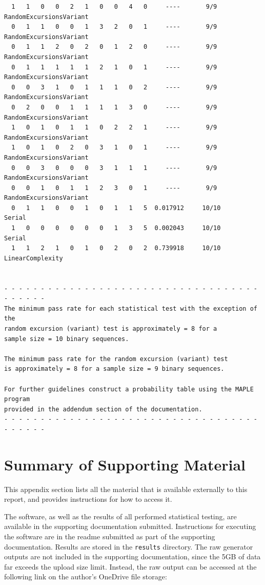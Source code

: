 \documentclass[12pt, titlepage]{report}
\theoremstyle{definition}
\begin{document}
\begin{verbatim}
  1   1   0   0   2   1   0   0   4   0     ----       9/9       RandomExcursionsVariant
  0   1   1   0   0   1   3   2   0   1     ----       9/9       RandomExcursionsVariant
  0   1   1   2   0   2   0   1   2   0     ----       9/9       RandomExcursionsVariant
  0   1   1   1   1   1   2   1   0   1     ----       9/9       RandomExcursionsVariant
  0   0   3   1   0   1   1   1   0   2     ----       9/9       RandomExcursionsVariant
  0   2   0   0   1   1   1   1   3   0     ----       9/9       RandomExcursionsVariant
  1   0   1   0   1   1   0   2   2   1     ----       9/9       RandomExcursionsVariant
  1   0   1   0   2   0   3   1   0   1     ----       9/9       RandomExcursionsVariant
  0   0   3   0   0   0   3   1   1   1     ----       9/9       RandomExcursionsVariant
  0   0   1   0   1   1   2   3   0   1     ----       9/9       RandomExcursionsVariant
  0   1   1   0   0   1   0   1   1   5  0.017912     10/10      Serial
  1   0   0   0   0   0   0   1   3   5  0.002043     10/10      Serial
  1   1   2   1   0   1   0   2   0   2  0.739918     10/10      LinearComplexity


- - - - - - - - - - - - - - - - - - - - - - - - - - - - - - - - - - - - - - - - -
The minimum pass rate for each statistical test with the exception of the
random excursion (variant) test is approximately = 8 for a
sample size = 10 binary sequences.

The minimum pass rate for the random excursion (variant) test
is approximately = 8 for a sample size = 9 binary sequences.

For further guidelines construct a probability table using the MAPLE program
provided in the addendum section of the documentation.
- - - - - - - - - - - - - - - - - - - - - - - - - - - - - - - - - - - - - - - - -
\end{verbatim}


\chapter{Summary of Supporting Material}
This appendix section lists all the material that is available externally to this report, and provides instructions for how to access it.

The software, as well as the results of all performed statistical testing, are available in the supporting documentation submitted. Instructions for executing the software are in the readme submitted as part of the supporting documentation. Results are stored in the \texttt{results} directory. The raw generator outputs are not included in the supporting documentation, since the 5GB of data far exceeds the upload size limit. Instead, the raw output can be accessed at the following link on the author's OneDrive file storage:
\end{document}
